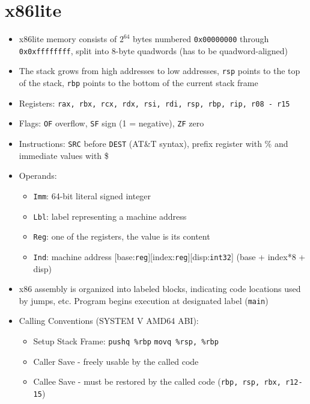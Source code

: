 \section*{x86lite}
\begin{itemize}
	\item x86lite memory consists of $2^{64}$ bytes numbered \texttt{0x00000000} through \texttt{0x0xffffffff}, split into 8-byte quadwords (has to be quadword-aligned)
	
	\item The stack grows from high addresses to low addresses, \texttt{rsp} points to the top of the stack, \texttt{rbp} points to the bottom of the current stack frame
	
	\item Registers: \texttt{rax, rbx, rcx, rdx, rsi, rdi, rsp, rbp, rip, r08 - r15}
	
	\item Flags: \texttt{OF} overflow, \texttt{SF} sign (1 = negative), \texttt{ZF} zero
	
	\item Instructions: \texttt{SRC} before \texttt{DEST} (AT\&T syntax), prefix register with \% and immediate values with \$
	
	\item Operands:
	\begin{itemize}
		\item \texttt{Imm}: 64-bit literal signed integer
		\item \texttt{Lbl}: label representing a machine address
		\item \texttt{Reg}: one of the registers, the value is its content
		\item \texttt{Ind}: machine address [base:\texttt{reg}][index:\texttt{reg}][disp:\texttt{int32}] (base + index*8 + disp)
	\end{itemize}
	
	\item x86 assembly is organized into labeled blocks, indicating code locations used by jumps, etc. Program begins execution at designated label (\texttt{main})
	
	
	\item Calling Conventions (SYSTEM V AMD64 ABI):
	\begin{itemize}
		\item Setup Stack Frame: \newline
			\texttt{pushq \%rbp} \newline 
			\texttt{movq \%rsp, \%rbp}
		
		\item Caller Save - freely usable by the called code
		\item Callee Save - must be restored by the called code (\texttt{rbp, rsp, rbx, r12-15})
		

\end{itemize}
\end{itemize}
